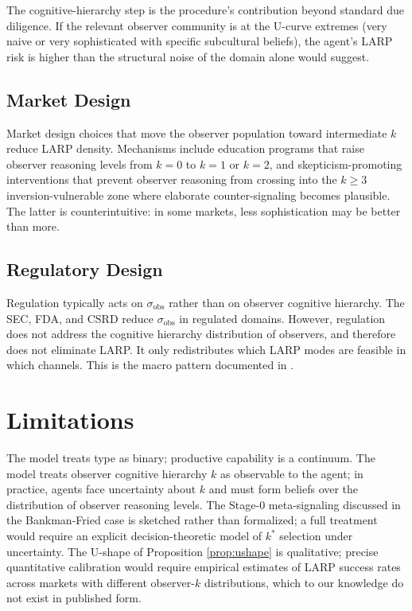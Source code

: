 \documentclass[11pt]{article}
\begin{document}
The cognitive-hierarchy step is the procedure's contribution beyond standard due diligence. If the relevant observer community is at the U-curve extremes (very naive or very sophisticated with specific subcultural beliefs), the agent's LARP risk is higher than the structural noise of the domain alone would suggest.

\subsection{Market Design}

Market design choices that move the observer population toward intermediate $k$ reduce LARP density. Mechanisms include education programs that raise observer reasoning levels from $k = 0$ to $k = 1$ or $k = 2$, and skepticism-promoting interventions that prevent observer reasoning from crossing into the $k \geq 3$ inversion-vulnerable zone where elaborate counter-signaling becomes plausible. The latter is counterintuitive: in some markets, less sophistication may be better than more.

\subsection{Regulatory Design}

Regulation typically acts on $\sigma_{\mathrm{obs}}$ rather than on observer cognitive hierarchy. The SEC, FDA, and CSRD reduce $\sigma_{\mathrm{obs}}$ in regulated domains. However, regulation does not address the cognitive hierarchy distribution of observers, and therefore does not eliminate LARP. It only redistributes which LARP modes are feasible in which channels. This is the macro pattern documented in \cite{vosteen2026waterbed}.

\section{Limitations}

The model treats type as binary; productive capability is a continuum. The model treats observer cognitive hierarchy $k$ as observable to the agent; in practice, agents face uncertainty about $k$ and must form beliefs over the distribution of observer reasoning levels. The Stage-0 meta-signaling discussed in the Bankman-Fried case is sketched rather than formalized; a full treatment would require an explicit decision-theoretic model of $k^*$ selection under uncertainty. The U-shape of Proposition \ref{prop:ushape} is qualitative; precise quantitative calibration would require empirical estimates of LARP success rates across markets with different observer-$k$ distributions, which to our knowledge do not exist in published form.
\end{document}

